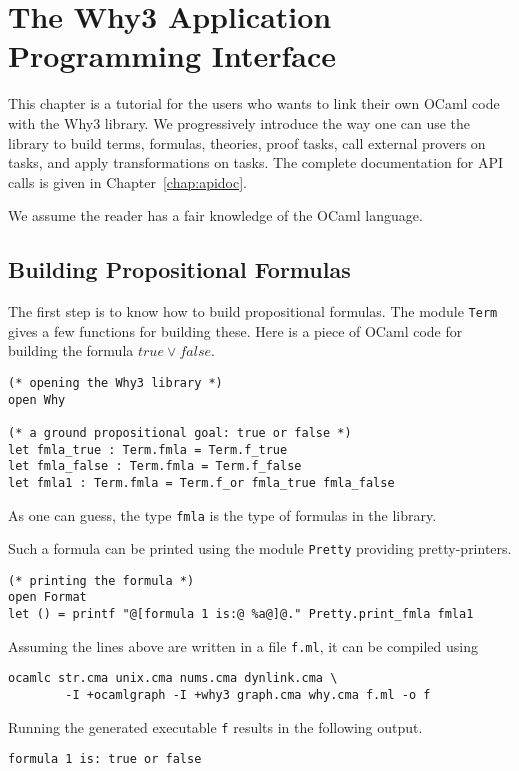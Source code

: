 \chapter{The Why3 Application Programming Interface}
\label{chap:api}

This chapter is a tutorial for the users who wants to link their own
OCaml code with the Why3 library. We progressively introduce the way
one can use the library to build terms, formulas, theories, proof
tasks, call external provers on tasks, and apply transformations on
tasks. The complete documentation for API calls is given in
Chapter~\ref{chap:apidoc}.

We assume the reader has a fair knowledge of the OCaml language. 


\section{Building Propositional Formulas}

The first step is to know how to build propositional formulas. The
module \texttt{Term} gives a few functions for building these. Here is
a piece of OCaml code for building the formula $true \lor false$.
\begin{verbatim}
(* opening the Why3 library *)
open Why

(* a ground propositional goal: true or false *)
let fmla_true : Term.fmla = Term.f_true
let fmla_false : Term.fmla = Term.f_false
let fmla1 : Term.fmla = Term.f_or fmla_true fmla_false
\end{verbatim}
As one can guess, the type \texttt{fmla} is the type of formulas in
the library.

Such a formula can be printed using the module \texttt{Pretty}
providing pretty-printers.
\begin{verbatim}
(* printing the formula *)
open Format
let () = printf "@[formula 1 is:@ %a@]@." Pretty.print_fmla fmla1
\end{verbatim}

Assuming the lines above are written in a file \texttt{f.ml}, it can
be compiled using
\begin{verbatim}
ocamlc str.cma unix.cma nums.cma dynlink.cma \
        -I +ocamlgraph -I +why3 graph.cma why.cma f.ml -o f
\end{verbatim}
Running the generated executable \texttt{f} results in the following output.
\begin{verbatim}
formula 1 is: true or false
\end{verbatim}

